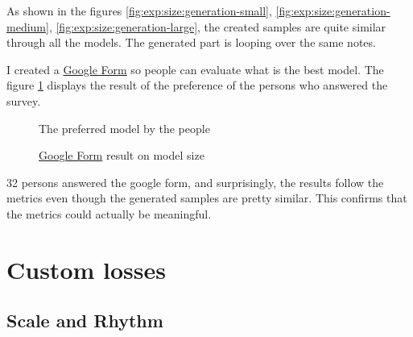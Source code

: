 \documentclass[12pt]{report}
\begin{document}
As shown in the figures \ref{fig:exp:size:generation-small}, \ref{fig:exp:size:generation-medium}, \ref{fig:exp:size:generation-large}, the created samples are quite similar through all the models.
The generated part is looping over the same notes.


I created a \href{https://docs.google.com/forms/d/e/1FAIpQLSdBn0DZZe-8YPvLYl-vovapk1iMnteeLzGfFJ7R00D3eA-Ydw/viewform?usp=sf_link}{Google Form} so people can evaluate what is the best model.
The figure \ref{fig:pie:size} displays the result of the preference of the persons who answered the survey.

\begin{figure}
    \begin{center}
    \caption{\href{https://docs.google.com/forms/d/e/1FAIpQLSdBn0DZZe-8YPvLYl-vovapk1iMnteeLzGfFJ7R00D3eA-Ydw/viewform?usp=sf_link}{Google Form} result on model size}
    The preferred model by the people
    \label{fig:pie:size}
    \end{center}
\end{figure}

32 persons answered the google form, and surprisingly, the results follow the metrics even though the generated samples are pretty similar.
This confirms that the metrics could actually be meaningful.

\section{Custom losses}

\subsection{Scale and Rhythm}
\label{sec:exp:scale-rhythm}

\end{document}
